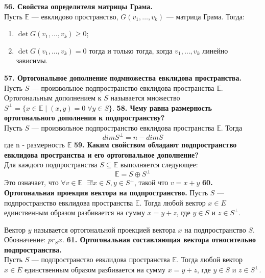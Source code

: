 \documentclass{article}
\begin{document}
\newline
\newline
\textbf{56. Свойства определителя матрицы Грама.}\\
Пусть $\mathbb{E}$ --- евклидово пространство, $G(v_1,\ldots, v_k)$ --- матрица Грама. Тогда:
\begin{enumerate}
	\item $\det G(v_1, \ldots, v_k) \geqslant 0$;
	\item $\det G(v_1, \ldots, v_k) = 0$ тогда и только тогда, когда $v_1, \ldots, v_k$ линейно зависимы.
\end{enumerate}
\textbf{57. Ортогональное дополнение подмножества евклидова пространства.}\\
Пусть $S$ --- произвольное подпространство евклидова пространства $\mathbb{E}$. Ортогональным дополнением к $S$ называется множество $S^{\perp} = \{x\in \mathbb{E}\; |\; (x,y) = 0\;\forall y \in S\}$.
\newline
\newline
\textbf{58. Чему равна размерность ортогонального дополнения к подпространству?}\\
Пусть $S$ --- произвольное подпространство евклидова пространства $\mathbb{E}$. Тогда
$$dimS^{\perp}=n-dimS$$
где n - размерность $\mathbb{E}$
\newline
\newline
\textbf{59. Каким свойством обладают подпространство евклидова пространства и его ортогональное дополнение?}\\
Для каждого подпространства $S \subseteq\mathbb{E}$ выполняется следующее:
$$\mathbb{E}=S\oplus S^{\perp}$$
Это означает, что $\forall v \in \mathbb{E}~~~\exists!x\in S, y \in S^{\perp}$, такой что $v = x+y$
\newline
\newline
\textbf{60. Ортогональная проекция вектора на подпространство.}
Пусть $S$ --- подпространство евклидова пространства $\mathbb{E}$. Тогда любой вектор $x \in E$ единственным образом разбивается на сумму $x = y + z$, где $y \in S$ и $z \in S^\perp$. 

Вектор $y$ называется ортогональной проекцией вектора $x$ на подпространство $S$. Обозначение: $pr_S x$. 
\newline
\newline
\textbf{61. Ортогональная составляющая вектора относительно подпространства.}\\
Пусть $S$ --- подпространство евклидова пространства $\mathbb{E}$. Тогда любой вектор $x \in E$ единственным образом разбивается на сумму $x = y + z$, где $y \in S$ и $z \in S^\perp$. 
\end{document}
